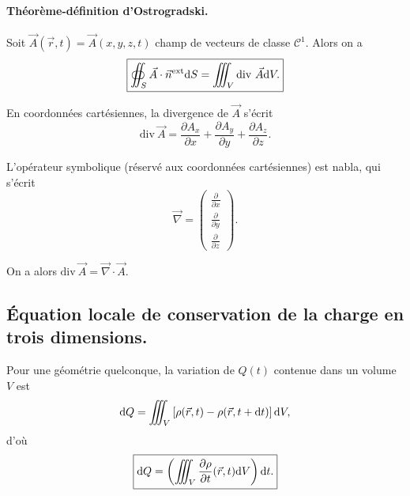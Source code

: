         \paragraph{Théorème-définition d'Ostrogradski.}

            Soit $\vec{A}(\vec{r},t)=\vec{A}(x,y,z,t)$ champ de vecteurs de classe $\mathcal{C}^{1}$. Alors on a 
            \begin{equation}
                \boxed{
                    \oiint_{S}\vec{A}\cdot\vec{n}^{\text{ext}}\mathrm{d} S=\iiint_{V}\mathrm{div}~\vec{A}\mathrm{d} V.
                }
            \end{equation}

            En coordonnées cartésiennes, la divergence de $\vec{A}$ s'écrit 
            \begin{equation}
                \boxed{
                    \mathrm{div}~\vec{A}=\frac{\partial A_x}{\partial x}+\frac{\partial A_y}{\partial y}+\frac{\partial A_z}{\partial z}.
                }
            \end{equation}

            L'opérateur symbolique (réservé aux coordonnées cartésiennes) est \og nabla\fg, qui s'écrit
            \begin{equation}
                \boxed{
                    \vec{\nabla}=\begin{pmatrix}
                        \frac{\partial}{\partial x}\\[0.2cm]
                        \frac{\partial}{\partial y}\\[0.2cm]
                        \frac{\partial}{\partial z}
                    \end{pmatrix}.
                }
            \end{equation}

            On a alors $\mathrm{div}~\vec{A}=\vec{\nabla}\cdot\vec{A}$.

    \subsection{Équation locale de conservation de la charge en trois dimensions.}

        Pour une géométrie quelconque, la variation de $Q(t)$ contenue dans un volume $V$ est 
        \begin{equation}
            \mathrm{d} Q=\iiint_{V}\left[\rho(\vec{r},t)-\rho(\vec{r},t+\mathrm{d} t)\right]\mathrm{d} V,
        \end{equation}
        d'où 
        \begin{equation}
            \boxed{
                \mathrm{d} Q=\left(\iiint_{V}\frac{\partial \rho}{\partial t}(\vec{r},t)\mathrm{d} V\right)\mathrm{d} t.
            }
        \end{equation}

